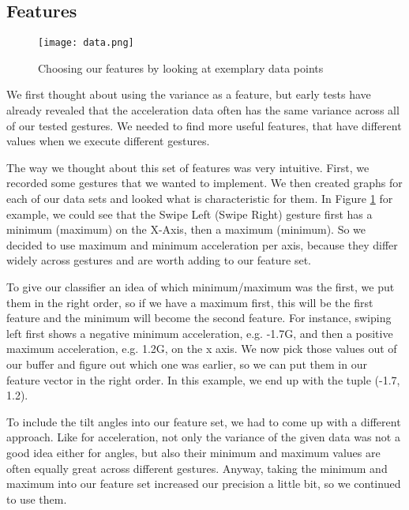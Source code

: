 \subsection{Features}
\label{ch:DataCollection:sec:FeatureDesign:sub:Features}

\begin{figure}
\begin{center}
  \texttt{[image: data.png]}
\caption{Choosing our features by looking at exemplary data points}\label{fig:datamining}
\end{center}
\end{figure} 

We  first  thought  about  using  the  variance  as  a  feature,  but  early  tests  have already revealed  that  the  acceleration  data  often  has  the same variance across all of our tested gestures. We needed to find more useful features, that have different values when we execute different gestures.

The way we thought about this set of features was very intuitive. First, we recorded some gestures that we wanted to implement.
We then created graphs for each of our data sets and looked what is characteristic for them.
In Figure \ref{fig:datamining} for example, we could see that the Swipe Left (Swipe Right) gesture first has a minimum (maximum) on the X-Axis, then a maximum (minimum).
So we decided to use maximum  and  minimum  acceleration  per  axis, because they  differ  widely  across gestures  and  are  worth  adding  to  our  feature  set.

To give our classifier an idea of which minimum/maximum was the first, we put them in the right order, so if we have a maximum first, this will be the first feature and the minimum will become the second feature.
For  instance,  swiping  left  first  shows  a negative  minimum  acceleration, e.g. -1.7G, and then a positive  maximum acceleration, e.g. 1.2G, on the x axis.
We now pick those values out of our buffer and figure out which one was earlier, so we can put them in our feature vector in the right order.
In  this example, we end up with the tuple (-1.7, 1.2).

To include the tilt angles into our feature set, we had to come up with a different approach.
Like for acceleration, not only the variance of the given data was not a good idea either for angles, but also their minimum and maximum values are often equally great across different gestures.
Anyway, taking the minimum and maximum into our feature set increased our precision a little bit, so we continued to use them.


